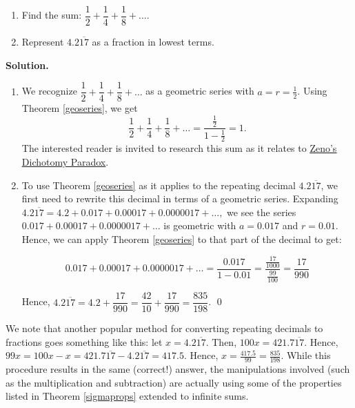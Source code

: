 \begin{ex} \label{geoseriesex} $~$

\begin{enumerate}

\item  Find the sum: $\dfrac{1}{2} + \dfrac{1}{4}  + \dfrac{1}{8} + \ldots$.  

\item Represent $4.2\overline{17}$ as a fraction in lowest terms. 

\end{enumerate}

{\bf Solution.}

\begin{enumerate}

\item  We recognize $\dfrac{1}{2} + \dfrac{1}{4}  + \dfrac{1}{8} + \ldots$ as a geometric series with $a = r = \frac{1}{2}$.  Using Theorem \ref{geoseries}, we get \[\dfrac{1}{2} + \dfrac{1}{4}  + \dfrac{1}{8} + \ldots = \dfrac{\frac{1}{2}}{1 - \frac{1}{2}} = 1.\]  The interested reader is invited to research this sum as it relates to  \href{https://en.wikipedia.org/wiki/Zeno's_paradoxes}{\underline{Zeno's Dichotomy Paradox}}.

\item  To use  Theorem \ref{geoseries} as it applies to the repeating decimal $4.2\overline{17}$, we first need to rewrite this decimal in terms of a geometric series.  Expanding  $4.2\overline{17} = 4.2 + 0.017 + 0.00017 + 0.0000017 + \ldots,$ we see the series $0.017 + 0.00017 + 0.0000017 + \ldots$ is geometric with $a = 0.017$ and $r = 0.01$.  Hence, we can apply Theorem \ref{geoseries} to that part of the decimal to get:

\[ 0.017 + 0.00017 + 0.0000017 + \ldots = \dfrac{0.017}{1 - 0.01} = \dfrac{\frac{17}{1000}}{\frac{99}{100}} = \frac{17}{990} \]

Hence, $4.2\overline{17} = 4.2 + \dfrac{17}{990} = \dfrac{42}{10} + \dfrac{17}{990} = \dfrac{835}{198}$. \qed

\end{enumerate}

\end{ex}

We note that another popular method for converting repeating decimals to fractions goes something like this:  let $x =4.2\overline{17}$. Then, $100x = 421.7\overline{17}$.  Hence, $99x = 100x - x = 421.7\overline{17} - 4.2\overline{17} = 417.5$.  Hence,  $x = \frac{417.5}{99}  = \frac{835}{198}$.  While this procedure results in the same (correct!) answer, the manipulations involved (such as the multiplication and subtraction) are actually using some of the properties listed in Theorem \ref{sigmaprops}  extended to infinite sums.


